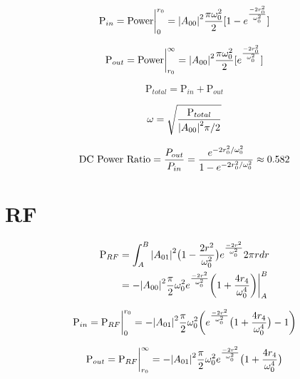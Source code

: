 \documentclass[oneside]{book}
\begin{document}
\begin{appendices}
	\begin{equation}
	\text{P}_{in} = \text{Power} \biggr\rvert_0^{r_0} = \abs{A_{00}}^2 \frac{\pi \omega_{0}^2}{2} [1 - e^{\frac{-2r_0^2}{\omega_{0}^2}}]
	\end{equation}
	
	\begin{equation}
	\text{P}_{out} = \text{Power} \biggr\rvert_{r_0}^{\infty} = \abs{A_{00}}^2 \frac{\pi \omega_{0}^2}{2} [e^{\frac{-2r_0^2}{\omega_{0}^2}}]
	\end{equation}
	
	\begin{equation}
	\text{P}_{total} =  \text{P}_{in} + \text{P}_{out}
	\end{equation}
	
	\begin{equation}
	\omega = \sqrt{\frac{\text{P}_{total}}{\abs{A_{00}}^2 \pi / 2}}
	\end{equation}
	
	\begin{equation}
	\text{DC Power Ratio} 
	= \frac{P_{out}}{P_{in}} \\
	= \frac{e^{-2r_0^2/ \omega_{0}^2}} {1 - e^{-2r_0^2/ \omega_{0}^2 }} \approx 0.582
	\end{equation}
	
	\section{RF}
	
	\begin{equation}
	\begin{split}
	\text{P}_{RF} &= \int_{A}^{B} \abs{A_{01}}^2 \big(1-\frac{2r^2}{\omega_{0}^2}\big) e^{\frac{-2r^2}{\omega_{0}^2}} 2\pi r dr\\
	&= -\abs{A_{00}}^2 \frac{\pi}{2} \omega_{0}^2 e^{\frac{-2r^2}{\omega_{0}^2}} \bigg(1 + \frac{4 r_4}{\omega_{0}^4} \bigg)  \biggr\rvert_A^B
	\end{split}
	\end{equation}
	
	\begin{equation}
	\text{P}_{in} \\
	= \text{P}_{RF} \biggr\rvert_0^{r_0} \\
	= - \abs{A_{01}}^2  \frac{\pi}{2} \omega_{0}^2 \bigg( e^{\frac{-2r^2}{\omega_{0}^2}} \big(1 + \frac{4 r_4}{\omega_{0}^4} \big) - 1 \bigg)
	\end{equation}
	
	\begin{equation}
	\text{P}_{out} \\
	= \text{P}_{RF} \biggr\rvert_{r_0}^{\infty}\\ 
	= - \abs{A_{01}}^2  \frac{\pi}{2} \omega_{0}^2 e^{\frac{-2r^2}{\omega_{0}^2}} \big(1 + \frac{4 r_4}{\omega_{0}^4} \big) 
	\end{equation}
	

\end{appendices}
\end{document}
